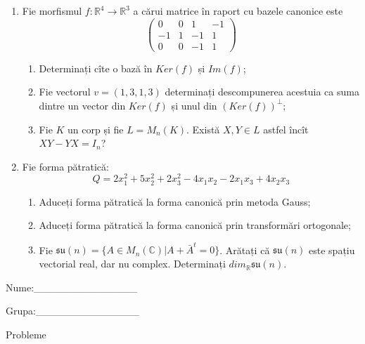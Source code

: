 \documentclass{article}
\begin{document}
\begin{enumerate}
 \item Fie morfismul $f:\mathbb{R}^4 \to \mathbb{R}^3$ a cărui matrice în raport cu bazele canonice este
$$\begin{pmatrix}
0&0&1&-1\\
-1&1&-1&1\\
0&0&-1&1
\end{pmatrix}$$

\begin{enumerate}
\item Determinați cîte o bază în $Ker(f)$ și $Im(f)$;
\item Fie vectorul $v=(1,3,1,3)$ determinați descompunerea acestuia ca suma dintre un vector din $Ker(f)$ și unul din $(Ker(f))^\perp$;
\item Fie $K$ un corp și fie $L=M_n(K)$. Există $X,Y \in L$ astfel încît $XY-YX=I_n$?  
\end{enumerate}
\item Fie forma pătratică:
$$Q= 2x_1^2+5x_2^2+2x_3^2-4x_1x_2-2x_1x_3+4x_2x_3$$

\begin{enumerate}
\item Aduceți forma pătratică la forma canonică prin metoda Gauss;
\item Aduceți forma pătratică la forma canonică prin transformări ortogonale;
\item Fie $\mathfrak{su}(n)=\{ A \in M_n(\mathbb{C}) | A+\bar{A}^t=0\}$. Arătați că $\mathfrak{su}(n)$ este spațiu vectorial real, dar nu complex.
Determinați $dim_{\mathbb{R}}\mathfrak{su}(n)$.
\end{enumerate}
\end{enumerate}
\newpage
\begin{flushright}
Nume:\_\_\_\_\_\_\_\_\_\_\_\_\_\_
 
 
Grupa:\_\_\_\_\_\_\_\_\_\_\_\_\_\_
\end{flushright}
\begin{center}
\vspace{2cm}
{\Large Probleme}
\vspace{2cm}
\end{center}
\end{document}
